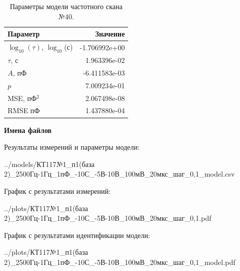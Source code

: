 \begin{table}[!ht]
    \centering
    \caption{Параметры модели частотного скана №40.}
    \begin{tabular}{|l|r|}
        \hline
        Параметр                                       & Значение                  \\ \hline
        $\log_{10}(\tau)$, $\log_{10}$(с)              & -1.706992e+00             \\ \hline
        $\tau$, с                                      & 1.963396e-02              \\ \hline
        $A$, пФ                                        & -6.411583e-03             \\ \hline
        $p$                                            & 7.009234e-01              \\ \hline
        MSE, пФ$^2$                                    & 2.067498e-08              \\ \hline
        RMSE пФ                                        & 1.437880e-04              \\ \hline
    \end{tabular}
    \label{table:frequency_scan_model_40}
\end{table}

\textbf{Имена файлов}

Результаты измерений и параметры модели:

\scriptsize../models/КТ117№1\_п1(база 2)\_2500Гц-1Гц\_1пФ\_-10С\_-5В-10В\_100мВ\_20мкс\_шаг\_0,1\_model.csv
\normalsize

График с результатами измерений:

\scriptsize../plots/КТ117№1\_п1(база 2)\_2500Гц-1Гц\_1пФ\_-10С\_-5В-10В\_100мВ\_20мкс\_шаг\_0,1.pdf
\normalsize

График с результатами идентификации модели:

\scriptsize../plots/КТ117№1\_п1(база 2)\_2500Гц-1Гц\_1пФ\_-10С\_-5В-10В\_100мВ\_20мкс\_шаг\_0,1\_model.pdf
\normalsize

